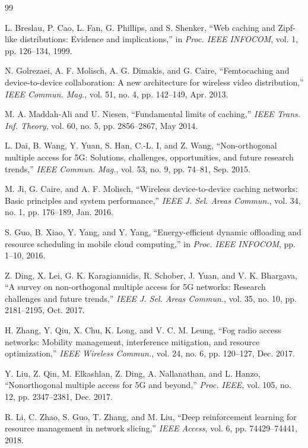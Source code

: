 \documentclass[12pt,a4paper]{article}
\begin{document}
\begin{thebibliography}{99}

L. Breslau, P. Cao, L. Fan, G. Phillips, and S. Shenker, ``Web caching and Zipf-like distributions: Evidence and implications,'' in \textit{Proc. IEEE INFOCOM}, vol. 1, pp. 126--134, 1999.

N. Golrezaei, A. F. Molisch, A. G. Dimakis, and G. Caire, ``Femtocaching and device-to-device collaboration: A new architecture for wireless video distribution,'' \textit{IEEE Commun. Mag.}, vol. 51, no. 4, pp. 142--149, Apr. 2013.

M. A. Maddah-Ali and U. Niesen, ``Fundamental limits of caching,'' \textit{IEEE Trans. Inf. Theory}, vol. 60, no. 5, pp. 2856--2867, May 2014.

L. Dai, B. Wang, Y. Yuan, S. Han, C.-L. I, and Z. Wang, ``Non-orthogonal multiple access for 5G: Solutions, challenges, opportunities, and future research trends,'' \textit{IEEE Commun. Mag.}, vol. 53, no. 9, pp. 74--81, Sep. 2015.

M. Ji, G. Caire, and A. F. Molisch, ``Wireless device-to-device caching networks: Basic principles and system performance,'' \textit{IEEE J. Sel. Areas Commun.}, vol. 34, no. 1, pp. 176--189, Jan. 2016.

S. Guo, B. Xiao, Y. Yang, and Y. Yang, ``Energy-efficient dynamic offloading and resource scheduling in mobile cloud computing,'' in \textit{Proc. IEEE INFOCOM}, pp. 1--10, 2016.

Z. Ding, X. Lei, G. K. Karagiannidis, R. Schober, J. Yuan, and V. K. Bhargava, ``A survey on non-orthogonal multiple access for 5G networks: Research challenges and future trends,'' \textit{IEEE J. Sel. Areas Commun.}, vol. 35, no. 10, pp. 2181--2195, Oct. 2017.

H. Zhang, Y. Qiu, X. Chu, K. Long, and V. C. M. Leung, ``Fog radio access networks: Mobility management, interference mitigation, and resource optimization,'' \textit{IEEE Wireless Commun.}, vol. 24, no. 6, pp. 120--127, Dec. 2017.

Y. Liu, Z. Qin, M. Elkashlan, Z. Ding, A. Nallanathan, and L. Hanzo, ``Nonorthogonal multiple access for 5G and beyond,'' \textit{Proc. IEEE}, vol. 105, no. 12, pp. 2347--2381, Dec. 2017.

R. Li, C. Zhao, S. Guo, T. Zhang, and M. Liu, ``Deep reinforcement learning for resource management in network slicing,'' \textit{IEEE Access}, vol. 6, pp. 74429--74441, 2018.


\end{thebibliography}
\end{document}
